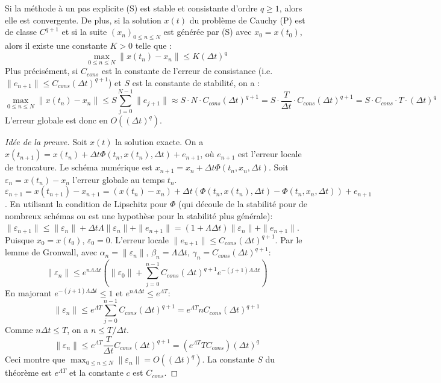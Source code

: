 \begin{theorem}
Si la méthode à un pas explicite (S) est stable et consistante d'ordre $q \ge 1$, alors elle est convergente.
De plus, si la solution $x(t)$ du problème de Cauchy (P) est de classe $C^{q+1}$ et si la suite $(x_n)_{0 \le n \le N}$ est générée par (S) avec $x_0 = x(t_0)$, alors il existe une constante $K > 0$ telle que :
\[
\max_{0 \le n \le N} \|x(t_n) - x_n\| \le K (\Delta t)^q
\]
Plus précisément, si $C_{cons}$ est la constante de l'erreur de consistance (i.e. $\|e_{n+1}\| \le C_{cons} (\Delta t)^{q+1}$) et $S$ est la constante de stabilité, on a :
\[
\max_{0 \le n \le N} \|x(t_n) - x_n\| \le S \sum_{j=0}^{N-1} \|e_{j+1}\| \approx S \cdot N \cdot C_{cons} (\Delta t)^{q+1} = S \cdot \frac{T}{\Delta t} \cdot C_{cons} (\Delta t)^{q+1} = S \cdot C_{cons} \cdot T \cdot (\Delta t)^q
\]
L'erreur globale est donc en $O((\Delta t)^q)$.
\end{theorem}
\begin{proof}[Idée de la preuve]
Soit $x(t)$ la solution exacte. On a $x(t_{n+1}) = x(t_n) + \Delta t \Phi(t_n, x(t_n), \Delta t) + e_{n+1}$, où $e_{n+1}$ est l'erreur locale de troncature.
Le schéma numérique est $x_{n+1} = x_n + \Delta t \Phi(t_n, x_n, \Delta t)$.
Soit $\varepsilon_n = x(t_n) - x_n$ l'erreur globale au temps $t_n$.
$\varepsilon_{n+1} = x(t_{n+1}) - x_{n+1} = (x(t_n) - x_n) + \Delta t (\Phi(t_n, x(t_n), \Delta t) - \Phi(t_n, x_n, \Delta t)) + e_{n+1}$.
En utilisant la condition de Lipschitz pour $\Phi$ (qui découle de la stabilité pour de nombreux schémas ou est une hypothèse pour la stabilité plus générale):
$\|\varepsilon_{n+1}\| \le \|\varepsilon_n\| + \Delta t \Lambda \|\varepsilon_n\| + \|e_{n+1}\| = (1 + \Lambda \Delta t)\|\varepsilon_n\| + \|e_{n+1}\|$.
Puisque $x_0 = x(t_0)$, $\varepsilon_0 = 0$. L'erreur locale $\|e_{n+1}\| \le C_{cons} (\Delta t)^{q+1}$.
Par le lemme de Gronwall, avec $\alpha_n = \|\varepsilon_n\|$, $\beta_n = \Lambda \Delta t$, $\gamma_n = C_{cons} (\Delta t)^{q+1}$:
\[
\|\varepsilon_n\| \le e^{n \Lambda \Delta t} \left( \|\varepsilon_0\| + \sum_{j=0}^{n-1} C_{cons} (\Delta t)^{q+1} e^{-(j+1)\Lambda \Delta t} \right)
\]
En majorant $e^{-(j+1)\Lambda \Delta t} \le 1$ et $e^{n \Lambda \Delta t} \le e^{\Lambda T}$:
\[
\|\varepsilon_n\| \le e^{\Lambda T} \sum_{j=0}^{n-1} C_{cons} (\Delta t)^{q+1} = e^{\Lambda T} n C_{cons} (\Delta t)^{q+1}
\]
Comme $n \Delta t \le T$, on a $n \le T/\Delta t$.
\[
\|\varepsilon_n\| \le e^{\Lambda T} \frac{T}{\Delta t} C_{cons} (\Delta t)^{q+1} = (e^{\Lambda T} T C_{cons}) (\Delta t)^q
\]
Ceci montre que $\max_{0 \le n \le N} \|\varepsilon_n\| = O((\Delta t)^q)$. La constante $S$ du théorème est $e^{\Lambda T}$ et la constante $c$ est $C_{cons}$.
\end{proof}

